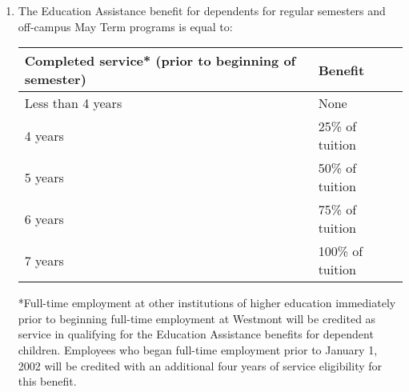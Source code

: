 \begin{enumerate}[label=\alph*)]
{\begin{enumerate}[label=\arabic*)]
{								\begin{enumerate}[label=(\alph*)]

									\item{Tuition for an off-campus program
										during the fall or spring semester will be
										set at the tuition rate charged for the
										on-campus semester. }

									\item{Tuition for an off-campus program during
										Mayterm or summer will be set at 70\% of the
										total cost of the program.  This benefit may be
										used for any Westmont sponsored off-campus
										program.  However, one semester of benefit will
										be assessed regardless of the units available on
										the program. }

								\end{enumerate}
							}

							\item{The Education Assistance
								benefit for dependents for regular semesters and
								off-campus May Term programs is equal to:

								\begin{center}
									\begin{tabular}{ |l|l| }
										\hline

										Completed service* (prior to beginning of semester) & Benefit          \\
										\hline
										Less than 4 years                                   & None             \\
										\hline
										4 years                                             & 25\% of tuition  \\
										\hline
										5 years                                             & 50\% of tuition  \\
										\hline
										6 years                                             & 75\% of tuition  \\
										\hline
										7 years                                             & 100\% of tuition \\
										\hline
									\end{tabular}
								\end{center}


								*Full-time employment at other institutions of
								higher education immediately prior to beginning
								full-time employment at Westmont will be
								credited as service in qualifying for the
								Education Assistance benefits for dependent
								children.  Employees who began full-time
								employment prior to January 1, 2002 will be
								credited with an additional four years of
								service eligibility for this benefit.
							}


\end{enumerate}}
\end{enumerate}
